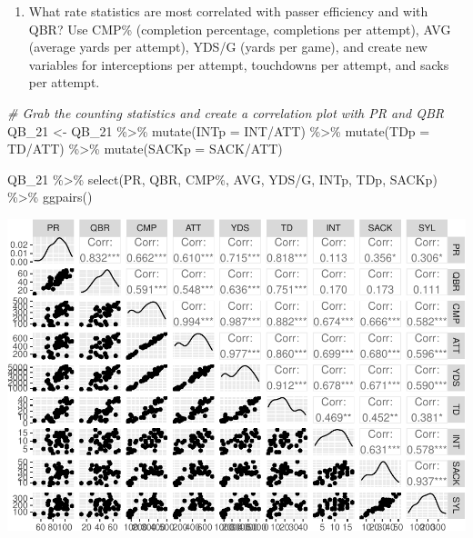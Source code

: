 \documentclass[
  11pt,
]{book}
\newenvironment{Shaded}{\begin{snugshade}}{\end{snugshade}}
\newcommand{\AttributeTok}[1]{\textcolor[rgb]{0.77,0.63,0.00}{#1}}
\newcommand{\CommentTok}[1]{\textcolor[rgb]{0.56,0.35,0.01}{\textit{#1}}}
\newcommand{\FunctionTok}[1]{\textcolor[rgb]{0.00,0.00,0.00}{#1}}
\newcommand{\NormalTok}[1]{#1}
\newcommand{\OtherTok}[1]{\textcolor[rgb]{0.56,0.35,0.01}{#1}}
\newcommand{\SpecialCharTok}[1]{\textcolor[rgb]{0.00,0.00,0.00}{#1}}
\newcommand{\StringTok}[1]{\textcolor[rgb]{0.31,0.60,0.02}{#1}}
\providecommand{\tightlist}{%
  \setlength{\itemsep}{0pt}\setlength{\parskip}{0pt}}
\theoremstyle{definition}
\theoremstyle{definition}
\theoremstyle{definition}
\theoremstyle{definition}
\theoremstyle{remark}
\begin{document}
\begin{enumerate}
\def\labelenumi{(\alph{enumi})}
\setcounter{enumi}{2}
\tightlist
\item
  What rate statistics are most correlated with passer efficiency and with QBR? Use CMP\% (completion percentage, completions per attempt), AVG (average yards per attempt), YDS/G (yards per game), and create new variables for interceptions per attempt, touchdowns per attempt, and sacks per attempt.
\end{enumerate}

\begin{Shaded}
\begin{Highlighting}[]
\CommentTok{\# Grab the counting statistics and create a correlation plot with PR and QBR}
\NormalTok{QB\_21 }\OtherTok{\textless{}{-}}\NormalTok{ QB\_21 }\SpecialCharTok{\%\textgreater{}\%}
    \FunctionTok{mutate}\NormalTok{(}\AttributeTok{INTp =}\NormalTok{ INT}\SpecialCharTok{/}\NormalTok{ATT) }\SpecialCharTok{\%\textgreater{}\%}
    \FunctionTok{mutate}\NormalTok{(}\AttributeTok{TDp =}\NormalTok{ TD}\SpecialCharTok{/}\NormalTok{ATT) }\SpecialCharTok{\%\textgreater{}\%}
    \FunctionTok{mutate}\NormalTok{(}\AttributeTok{SACKp =}\NormalTok{ SACK}\SpecialCharTok{/}\NormalTok{ATT)}

\NormalTok{QB\_21 }\SpecialCharTok{\%\textgreater{}\%}
    \FunctionTok{select}\NormalTok{(PR, QBR, }\StringTok{\textasciigrave{}}\AttributeTok{CMP\%}\StringTok{\textasciigrave{}}\NormalTok{, AVG, }\StringTok{\textasciigrave{}}\AttributeTok{YDS/G}\StringTok{\textasciigrave{}}\NormalTok{, INTp, TDp, SACKp) }\SpecialCharTok{\%\textgreater{}\%}
    \FunctionTok{ggpairs}\NormalTok{()}
\end{Highlighting}
\end{Shaded}

\includegraphics{series_files/figure-latex/unnamed-chunk-22-1.pdf}
\end{document}
